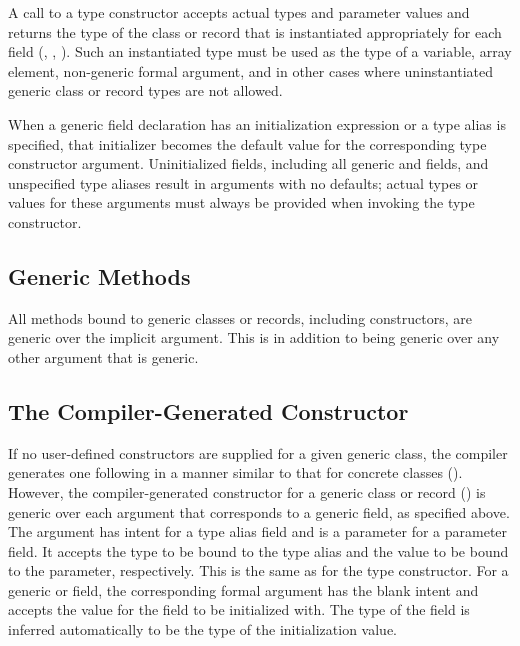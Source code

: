 A call to a type constructor accepts actual types and parameter values
and returns the type of the class or record that is instantiated
appropriately for each field
(, ,
).
Such an instantiated type must be used as the type of a variable,
array element, non-generic formal argument, and in other cases
where uninstantiated generic class or record types are not allowed.

When a generic field declaration has an initialization expression
or a type alias is specified, that initializer becomes the default value
for the corresponding type constructor argument.  Uninitialized
fields, including all generic  and  fields,
and unspecified type aliases result in arguments with no defaults;
actual types or values for these arguments must always be provided
when invoking the type constructor.

\subsection{Generic Methods}
\label{Generic_Methods}

All methods bound to generic classes or records, including
constructors, are generic over the implicit  argument.
This is in addition to being generic over any other argument that is generic.

\subsection{The Compiler-Generated Constructor}
\label{Generic_Compiler_Generated_Constructors}

If no user-defined constructors are supplied for a given generic class, the
compiler generates one following in a manner similar to that for concrete
classes ().
However, the compiler-generated constructor for a generic class or record
() is generic over each argument that
corresponds to a generic field, as specified above.
The argument has intent  for a type alias field and is a
parameter for a parameter field. It accepts the type to be bound
to the type alias and the value to be bound to the parameter, respectively.
This is the same as for the type constructor.
For a generic  or  field, the corresponding
formal argument has the blank intent and accepts the value
for the field to be initialized with. The type of the field
is inferred automatically to be the type of the initialization value.

